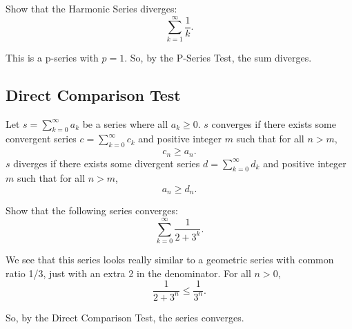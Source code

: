 \begin{example}
	Show that the Harmonic Series diverges:
	\begin{equation*}
		\sum_{k=1}^{\infty}{\frac{1}{k}}.
	\end{equation*}
\end{example}
\begin{answer}
	
	This is a p-series with $p=1$.
	So, by the P-Series Test, the sum diverges.
\end{answer}

\subsection{Direct Comparison Test}
\begin{lemma}
	Let $s = \sum_{k=0}^{\infty}{a_k}$ be a series where all $a_k \geq 0$.
	$s$ converges if there exists some convergent series $c = \sum_{k=0}^{\infty}{c_k}$ and positive integer $m$ such that for all $n > m$,
	\begin{equation*}
		c_n \geq a_n.
	\end{equation*}
	$s$ diverges if there exists some divergent series $d = \sum_{k=0}^{\infty}{d_k}$ and positive integer $m$ such that for all $n > m$,
	\begin{equation*}
		a_n \geq d_n.
	\end{equation*}
\end{lemma}

\begin{example}
	Show that the following series converges:
	\begin{equation*}
		\sum_{k=0}^{\infty}{\frac{1}{2 + 3^k}}.
	\end{equation*}
\end{example}
\begin{answer}
We see that this series looks really similar to a geometric series with common ratio 1/3, just with an extra 2 in the denominator.
For all $n > 0$,
\begin{equation*}
	\frac{1}{2+3^n} \leq \frac{1}{3^n}.
\end{equation*}

So, by the Direct Comparison Test, the series converges.
\end{answer}


